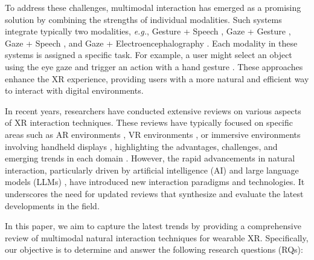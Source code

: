 \documentclass[review]{fcs}
\newcommand{\revise}[2]{\textcolor[rgb]{0,0,0}{#2}}
\begin{document}
To address these challenges, multimodal interaction has emerged as a promising solution by combining the strengths of individual modalities. \revise{Typically, such systems integrate two modalities, \textit{e.g.}, Gesture + Speech \cite{DBLP:conf/chi/CaoKWAX24, DBLP:conf/chi/TorreFHBFL24}, Gaze + Gesture \cite{DBLP:journals/tvcg/SidenmarkP0CGWG22, 10.1145/3530886}, Gaze + Speech \cite{10.1145/3613904.3642068}, or Gaze + Electroencephalography \cite{DBLP:conf/embc/WangDCS15}.}{Such systems integrate typically two modalities, \textit{e.g.}, Gesture + Speech \cite{DBLP:conf/chi/CaoKWAX24, DBLP:conf/chi/TorreFHBFL24}, Gaze + Gesture \cite{DBLP:journals/tvcg/SidenmarkP0CGWG22, 10.1145/3530886}, Gaze + Speech \cite{10.1145/3613904.3642068}, and Gaze + Electroencephalography \cite{DBLP:conf/embc/WangDCS15}.}
\revise{In these systems, each modality is assigned a specific task.}{Each modality in these systems is assigned a specific task.} For example, a user might select an object using the eye gaze and trigger an action with a hand gesture \cite{10108465}. These approaches enhance the XR experience, providing users with a more natural and efficient way to interact with digital environments.


In recent years, researchers have conducted extensive reviews on various aspects of XR interaction techniques. These reviews have typically focused on specific areas such as AR environments \cite{DBLP:journals/tvcg/TranBWBP23, DBLP:conf/ismar/HertelKSBSS21}, VR environments \cite{pirker2021potential, katona2021review}, or immersive environments involving handheld displays \cite{DBLP:journals/vi/ZhangWZST23, DBLP:journals/tvcg/SpittlePC023}, highlighting the advantages, challenges, and emerging trends in each domain \cite{DBLP:journals/tvcg/TranBWBP23, DBLP:journals/tvcg/SpittlePC023}. However, the rapid advancements in natural interaction, particularly driven by artificial intelligence (AI) and large language models (LLMs) \cite{DBLP:conf/vr/GiunchiNGS24, DBLP:conf/chi/WangYWJ024, DBLP:conf/vr/YangQCSBLL24}, have introduced new interaction paradigms and technologies. It underscores the need for updated reviews that synthesize and evaluate the latest developments in the field.

In this paper, we aim to capture the latest trends by providing a comprehensive review of multimodal natural interaction techniques for wearable XR. \revise{}{Specifically, our objective is to determine and answer the following research questions (RQs):}
\end{document}
